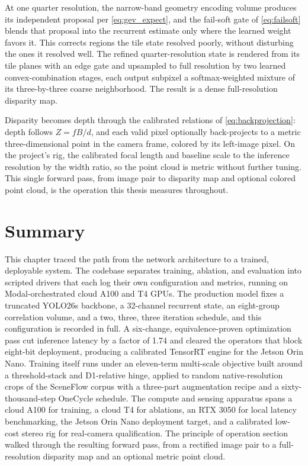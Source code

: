 At one quarter resolution, the narrow-band geometry encoding volume
produces its independent proposal per \eqref{eq:gev_expect}, and the
fail-soft gate of \eqref{eq:failsoft} blends that proposal into the
recurrent estimate only where the learned weight favors it. This
corrects regions the tile state resolved poorly, without disturbing the
ones it resolved well. The refined quarter-resolution state is rendered
from its tile planes with an edge gate and upsampled to full resolution
by two learned convex-combination stages, each output subpixel a
softmax-weighted mixture of its three-by-three coarse neighborhood. The
result is a dense full-resolution disparity map.

Disparity becomes depth through the calibrated relations of
\eqref{eq:backprojection}: depth follows $Z = fB/d$, and each valid
pixel optionally back-projects to a metric three-dimensional point in
the camera frame, colored by its left-image pixel. On the project's
rig, the calibrated focal length and baseline scale to the inference
resolution by the width ratio, so the point cloud is metric without
further tuning. This single forward pass, from image pair to disparity
map and optional colored point cloud, is the operation this thesis
measures throughout.

\FloatBarrier
\section{Summary}
This chapter traced the path from the network architecture to a
trained, deployable system. The codebase separates training, ablation,
and evaluation into scripted drivers that each log their own
configuration and metrics, running on Modal-orchestrated cloud A100 and
T4 GPUs. The production model fixes a truncated YOLO26s backbone, a
32-channel recurrent state, an eight-group correlation volume, and a
two, three, three iteration schedule, and this configuration is
recorded in full. A six-change, equivalence-proven optimization pass
cut inference latency by a factor of 1.74 and cleared the operators
that block eight-bit deployment, producing a calibrated TensorRT engine
for the Jetson Orin Nano. Training itself runs under an eleven-term
multi-scale objective built around a threshold-stack and D1-relative
hinge, applied to random native-resolution crops of the SceneFlow
corpus with a three-part augmentation recipe and a sixty-thousand-step
OneCycle schedule. The compute and sensing apparatus spans a cloud A100
for training, a cloud T4 for ablations, an RTX 3050 for local latency
benchmarking, the Jetson Orin Nano deployment target, and a calibrated
low-cost stereo rig for real-camera qualification. The principle of
operation section walked through the resulting forward pass, from a
rectified image pair to a full-resolution disparity map and an optional
metric point cloud.

